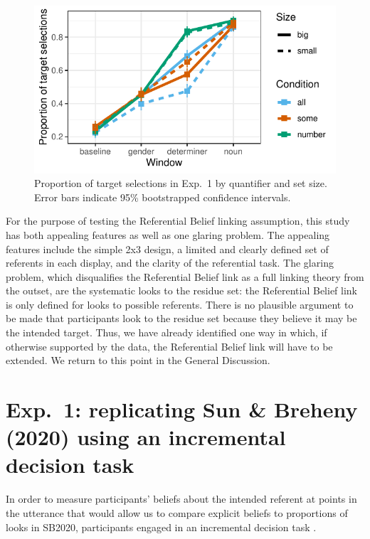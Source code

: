 \documentclass[10pt,letterpaper]{article}
\newcommand{\expref}[1]{Exp.~#1}
\begin{document}
\begin{figure}[tbh!]
\centering
\includegraphics[width=\columnwidth]{../../analysis/SunBreheny/1_incremental/main/graphs/results-target-all-looks}
\caption{Proportion of target selections in \expref{1} by quantifier and set size. Error bars indicate 95\% bootstrapped confidence intervals.} 
\label{fig:results-idt}
\end{figure}


For the purpose of testing the Referential Belief linking assumption, this study has both appealing features as well as one glaring problem. The appealing features include the simple 2x3 design, a limited and clearly defined set of referents in each display, and the clarity of the referential task. The glaring problem, which disqualifies the Referential Belief link as a full linking theory from the outset, are the systematic looks to the residue set: the Referential Belief link is only defined for looks to possible referents. There is no plausible argument to be made that participants look to the residue set because they believe it may be the intended target.  Thus, we have already identified one way in which, if otherwise supported by the data, the Referential Belief link will have to be extended. We return to this point in the General Discussion.


\section{Exp.~1: replicating Sun \& Breheny (2020) using an incremental decision task}

In order to measure participants' beliefs about the intended referent at points in the utterance that would allow us to compare explicit beliefs to proportions of looks in SB2020, participants engaged in an incremental decision task \cite{Allopenna1998,QingLD2018, KreissDegen2020,alsop2018}. 
\end{document}
